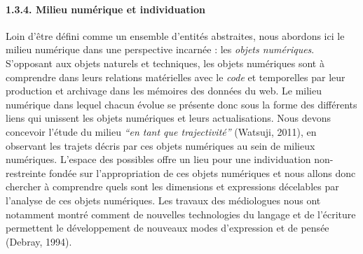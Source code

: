\paragraph[1.3.4. Milieu num\'erique et individuation]{1.3.4. Milieu num\'erique et individuation}
\hypertarget{RefHeading331699228146}{}{\color{black}
Loin d'\^etre d\'efini comme un ensemble d'entit\'es abstraites, nous abordons ici le milieu num\'erique dans une
perspective incarn\'ee : les \textit{objets num\'eriques}. S'opposant aux objets naturels et techniques, les objets
num\'eriques sont \`a comprendre dans leurs relations mat\'erielles avec le \textit{code} et temporelles par leur
production et archivage dans les m\'emoires des donn\'ees du web. Le milieu num\'erique dans lequel chacun \'evolue se
pr\'esente donc sous la forme des diff\'erents liens qui unissent les objets num\'eriques et leurs actualisations. Nous
devons concevoir l'\'etude du milieu \textit{{}``en tant que trajectivit\'e'' }(Watsuji, 2011), en observant les
trajets d\'ecris par ces objets num\'eriques au sein de milieux num\'eriques. L'espace des possibles offre un lieu pour
une individuation non-restreinte fond\'ee sur l'appropriation de ces objets num\'eriques et nous allons donc chercher
\`a comprendre quels sont les dimensions et expressions d\'ecelables par l'analyse de ces objets num\'eriques. Les
travaux des m\'ediologues nous ont notamment montr\'e comment de nouvelles technologies du langage et de l'\'ecriture
permettent le d\'eveloppement de nouveaux modes d'expression et de pens\'ee (Debray, 1994). }


\bigskip

